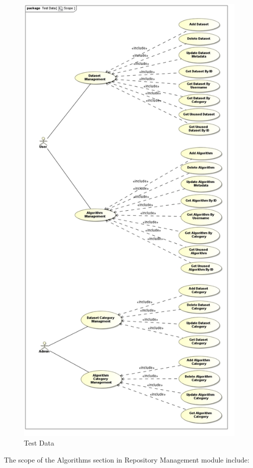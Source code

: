 \begin{figure}[H]
  \begin{center}
  \includegraphics[scale=0.7]{../Diagrams and Charts/Test Data/Scope.jpg}
  \caption{Test Data}
  \end{center}
  \label{fig:algorithmRepo}
\end{figure}
The scope of the Algorithms section in Repository Management module include:
\begin{itemize}

\end{itemize}

